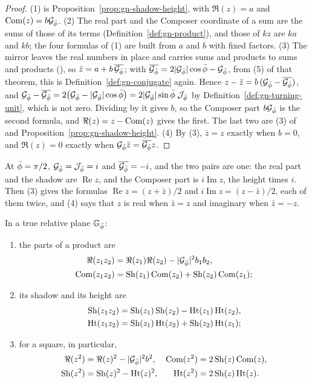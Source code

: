 \begin{proof}
(1) is Proposition~\ref{prop:gn-shadow-height}, with $\Re(z) = a$ and $\operatorname{Com}(z) = b\mathcal{G}_{\bar{\phi}}$. (2) The real part and the Composer coordinate of a sum are the sums of those of its terms (Definition~\ref{def:gn-product}), and those of $kz$ are $ka$ and $kb$; the four formulas of (1) are built from $a$ and $b$ with fixed factors. (3) The mirror leaves the real numbers in place and carries sums and products to sums and products (), so $\bar{z} = a + b\,\overline{\mathcal{G}_{\bar{\phi}}}$; with $\overline{\mathcal{G}_{\bar{\phi}}} = 2|\mathcal{G}_{\bar{\phi}}|\cos\bar{\phi} - \mathcal{G}_{\bar{\phi}}$, from (5) of that theorem, this is Definition~\ref{def:gn-conjugate} again. Hence $z - \bar{z} = b\,(\mathcal{G}_{\bar{\phi}} - \overline{\mathcal{G}_{\bar{\phi}}})$, and $\mathcal{G}_{\bar{\phi}} - \overline{\mathcal{G}_{\bar{\phi}}} = 2\bigl(\mathcal{G}_{\bar{\phi}} - |\mathcal{G}_{\bar{\phi}}|\cos\bar{\phi}\bigr) = 2|\mathcal{G}_{\bar{\phi}}|\sin\bar{\phi}\;\mathcal{J}_{\bar{\phi}}$ by Definition~\ref{def:gn-turning-unit}, which is not zero. Dividing by it gives $b$, so the Composer part $b\mathcal{G}_{\bar{\phi}}$ is the second formula, and $\Re(z) = z - \operatorname{Com}(z)$ gives the first. The last two are (3) of  and Proposition~\ref{prop:gn-shadow-height}. (4) By (3), $\bar{z} = z$ exactly when $b = 0$, and $\Re(z) = 0$ exactly when $\mathcal{G}_{\bar{\phi}}\bar{z} = \overline{\mathcal{G}_{\bar{\phi}}}z$.
\end{proof}

\incomplex At $\bar{\phi} = \pi/2$, $\mathcal{G}_{\bar{\phi}} = \mathcal{J}_{\bar{\phi}} = i$ and $\overline{\mathcal{G}_{\bar{\phi}}} = -i$, and the two pairs are one: the real part and the shadow are $\operatorname{Re} z$, and the Composer part is $i\operatorname{Im} z$, the height times $i$. Then (3) gives the formulas $\operatorname{Re} z = (z + \bar{z})/2$ and $i\operatorname{Im} z = (z - \bar{z})/2$, each of them twice, and (4) says that $z$ is real when $\bar{z} = z$ and imaginary when $\bar{z} = -z$.

\begin{theorem}\label{thm:gn-parts-product}
In a true relative plane $\mathbb{G}_{\bar{\phi}}$:
\begin{enumerate}
  \item the parts of a product are
  \begin{align*}
  \Re(z_1z_2) &= \Re(z_1)\Re(z_2) - |\mathcal{G}_{\bar{\phi}}|^2 b_1b_2 , \\
  \operatorname{Com}(z_1z_2) &= \operatorname{Sh}(z_1)\operatorname{Com}(z_2) + \operatorname{Sh}(z_2)\operatorname{Com}(z_1) ;
  \end{align*}
  \item its shadow and its height are
  \begin{align*}
  \operatorname{Sh}(z_1z_2) &= \operatorname{Sh}(z_1)\operatorname{Sh}(z_2) - \operatorname{Ht}(z_1)\operatorname{Ht}(z_2) , \\
  \operatorname{Ht}(z_1z_2) &= \operatorname{Sh}(z_1)\operatorname{Ht}(z_2) + \operatorname{Sh}(z_2)\operatorname{Ht}(z_1) ;
  \end{align*}
  \item for a square, in particular,
  \begin{align*}
  \Re(z^2) &= \Re(z)^2 - |\mathcal{G}_{\bar{\phi}}|^2 b^2 , & \operatorname{Com}(z^2) &= 2\operatorname{Sh}(z)\operatorname{Com}(z) , \\
  \operatorname{Sh}(z^2) &= \operatorname{Sh}(z)^2 - \operatorname{Ht}(z)^2 , & \operatorname{Ht}(z^2) &= 2\operatorname{Sh}(z)\operatorname{Ht}(z) .
  \end{align*}
\end{enumerate}
\end{theorem}

